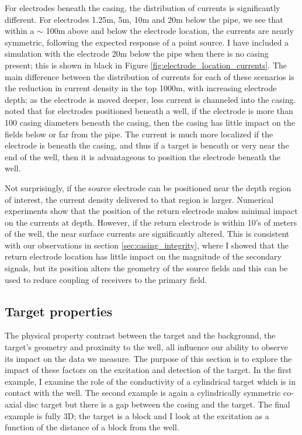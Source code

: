 For electrodes beneath the casing, the distribution of currents is significantly different. For electrodes 1.25m, 5m, 10m and 20m below the pipe, we see that within a $\sim$ 100m above and below the electrode location, the currents are nearly symmetric, following the expected response of a point source. I have included a simulation with the electrode 20m below the pipe when there is no casing present; this is shown in black in Figure \ref{fig:electrode_location_currents}. The main difference between the distribution of currents for each of these scenarios is the reduction in current density in the top 1000m, with increasing electrode depth; as the electrode is moved deeper, less current is channeled into the casing. \cite{Schenkel1990} noted that for electrodes positioned beneath a well, if the electrode is more than 100 casing diameters beneath the casing, then the casing has little impact on the fields below or far from the pipe. The current is much more localized if the electrode is beneath the casing, and thus if a target is beneath or very near the end of the well, then it is advantageous to position the electrode beneath the well.

Not surprisingly, if the source electrode can be positioned near the depth region of interest, the current density delivered to that region is larger. Numerical experiments show that the position of the return electrode makes minimal impact on the currents at depth. However, if the return electrode is within 10’s of meters of the well, the near surface currents are significantly altered. This is consistent with our observations in section \ref{sec:casing_integrity}, where I showed that the return electrode location has little impact on the magnitude of the secondary signals, but its position alters the geometry of the source fields and this can be used to reduce coupling of receivers to the primary field.


\subsection{Target properties}
The physical property contrast between the target and the background, the target’s geometry and proximity to the well, all influence our ability to observe its impact on the data we measure. The purpose of this section is to explore the impact of these factors on the excitation and detection of the target. In the first example, I examine the role of the conductivity of a cylindrical target which is in contact with  the well. The second example is again a cylindrically symmetric co-axial disc target but there is a gap between the casing and the target. The final example is fully 3D; the target is a block and I look at the excitation as a function of the distance of a block from the well.

